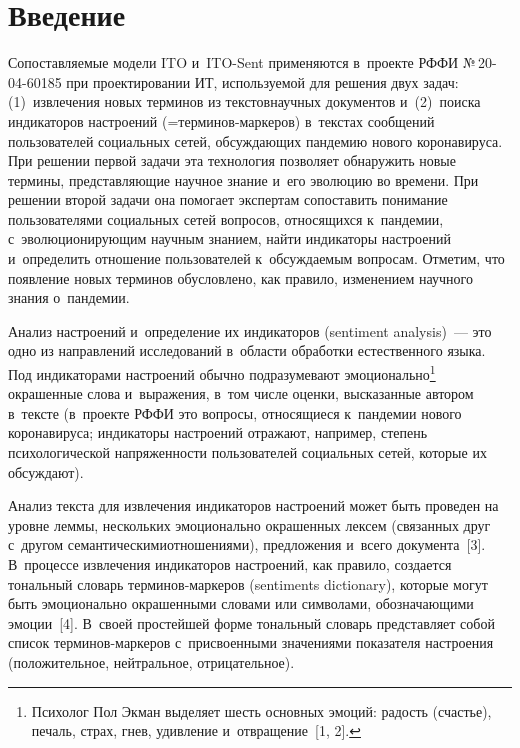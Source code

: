 
  



\thispagestyle{headings}

\begin{multicols}{2}

\label{st\stat}

\section{Введение}

  Сопоставляемые модели ITO и~ITO-Sent применяются в~проекте РФФИ  
№\,20-04-60185 при проектировании ИТ, используемой 
для решения двух задач: (1)~извлечения новых терминов из текстов\linebreak научных 
документов и~(2)~поиска индикаторов настроений (=\;тер\-ми\-нов-мар\-ке\-ров) 
в~текстах сообщений пользователей социальных сетей, об\-суж\-да\-ющих пандемию 
нового коронавируса. При \mbox{решении} первой задачи эта технология позволяет 
обнаружить новые термины, представляющие научное знание и~его эволюцию во 
времени. При решении второй задачи она помогает экспертам сопоставить 
понимание пользователями социальных сетей вопросов, относящихся к~пандемии, 
с~эво\-лю\-ци\-о\-ни\-ру\-ющим научным знанием, найти индикаторы настроений 
и~определить отношение пользователей к~обсуждаемым вопросам. Отметим, что 
появление новых терминов обуслов\-ле\-но, как правило, изменением научного 
знания о~пандемии.
  
  Анализ настроений и~определение их индикаторов (sentiment analysis)~--- это 
одно из направлений исследований в~области обработки естественного языка. Под 
индикаторами настроений обычно подразумевают эмоционально\footnote[4]{ Психолог 
Пол Экман выделяет шесть основных эмоций: радость (счастье), печаль, страх, гнев, удивление 
и~отвращение~[1, 2].} окрашенные слова и~выражения, в~том чис\-ле оценки, высказанные 
автором в~тексте (в~проекте РФФИ это вопросы, относящиеся к~пандемии нового 
коронавируса; индикаторы настроений отражают, например, степень 
психологической на\-пря\-жен\-ности пользователей социальных сетей, которые их 
обсуждают).
  
  Анализ текста для извлечения индикаторов настроений может быть проведен на 
уровне леммы, нескольких эмоционально окрашенных лексем (связанных друг 
с~другом семантическими\linebreak отношениями), предложения и~всего документа~[3]. 
В~процессе извлечения индикаторов настроений, как правило, создается 
тональный словарь тер\-ми\-нов-мар\-ке\-ров (sentiments dictionary), которые могут 
быть эмоционально окрашенными словами или символами, обозначающими 
эмоции~[4]. В~своей простейшей форме тональный словарь представляет собой 
список тер\-ми\-нов-мар\-ке\-ров с~присвоенными значениями показателя 
настроения (положительное, нейтральное, отрицательное).


\end{multicols}
